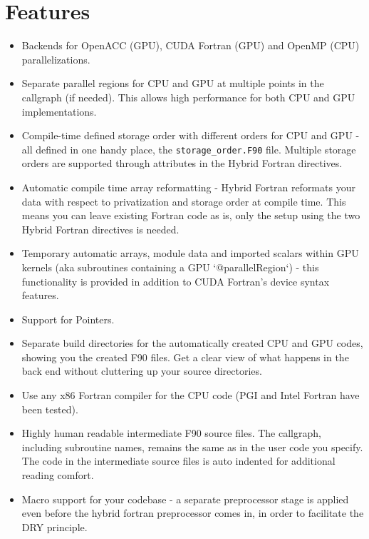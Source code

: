\section{Features} \label{sec:features}
\begin{itemize}
 \item Backends for OpenACC (GPU), CUDA Fortran (GPU) and OpenMP (CPU) parallelizations.

 \item Separate parallel regions for CPU and GPU at multiple points in the callgraph (if needed). This allows high performance for both CPU and GPU implementations.

 \item Compile-time defined storage order with different orders for CPU and GPU - all defined in one handy place, the \verb|storage_order.F90| file. Multiple storage orders are supported through attributes in the Hybrid Fortran directives.

 \item Automatic compile time array reformatting - Hybrid Fortran reformats your data with respect to privatization and storage order at compile time. This means you can leave existing Fortran code as is, only the setup using the two Hybrid Fortran directives is needed.

 \item Temporary automatic arrays, module data and imported scalars within GPU kernels (aka subroutines containing a GPU `@parallelRegion`) - this functionality is provided in addition to CUDA Fortran's device syntax features.

 \item Support for Pointers.

 \item Separate build directories for the automatically created CPU and GPU codes, showing you the created F90 files. Get a clear view of what happens in the back end without cluttering up your source directories.

 \item Use any x86 Fortran compiler for the CPU code (PGI and Intel Fortran have been tested).

 \item Highly human readable intermediate F90 source files. The callgraph, including subroutine names, remains the same as in the user code you specify. The code in the intermediate source files is auto indented for additional reading comfort.

 \item Macro support for your codebase - a separate preprocessor stage is applied even before the hybrid fortran preprocessor comes in, in order to facilitate the DRY principle.


\end{itemize}

